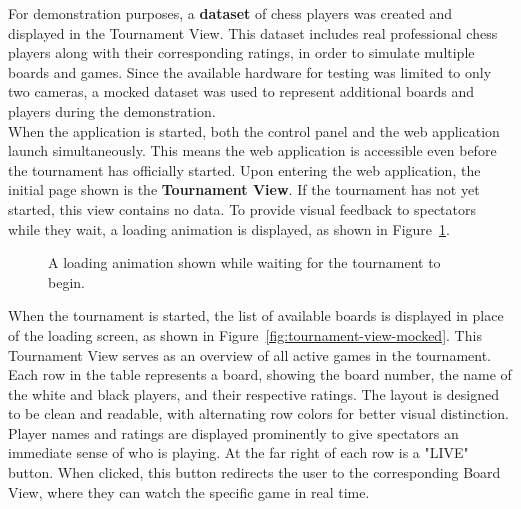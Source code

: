 For demonstration purposes, a \textbf{dataset} of chess players was created and displayed in the Tournament View. This dataset includes real professional chess players along with their corresponding ratings, in order to simulate multiple boards and games. Since the available hardware for testing was limited to only two cameras, a mocked dataset was used to represent additional boards and players during the demonstration. \\

When the application is started, both the control panel and the web application launch simultaneously. This means the web application is accessible even before the tournament has officially started. Upon entering the web application, the initial page shown is the \textbf{Tournament View}. If the tournament has not yet started, this view contains no data. To provide visual feedback to spectators while they wait, a loading animation is displayed, as shown in Figure~\ref{fig:tournament-view-loading}.\\

\begin{figure}[h!] \centering {}\caption[Loading animation]{A loading animation shown while waiting for the tournament to begin.}\label{fig:tournament-view-loading} \end{figure}

When the tournament is started, the list of available boards is displayed in place of the loading screen, as shown in Figure~\ref{fig:tournament-view-mocked}. This Tournament View serves as an overview of all active games in the tournament. Each row in the table represents a board, showing the board number, the name of the white and black players, and their respective ratings. The layout is designed to be clean and readable, with alternating row colors for better visual distinction. Player names and ratings are displayed prominently to give spectators an immediate sense of who is playing. At the far right of each row is a "LIVE" button. When clicked, this button redirects the user to the corresponding Board View, where they can watch the specific game in real time. \\

